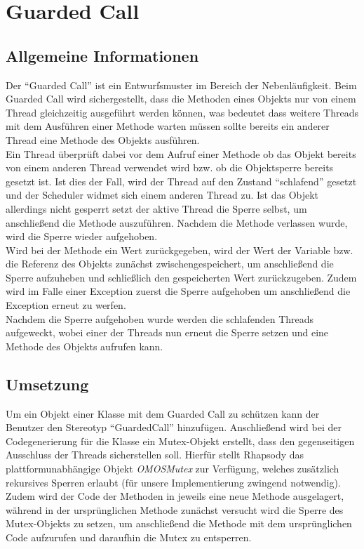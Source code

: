 \chapter{Guarded Call}

\section{Allgemeine Informationen}
Der \enquote{Guarded Call} ist ein Entwurfsmuster im Bereich der Nebenläufigkeit. Beim Guarded Call wird sichergestellt, dass die Methoden eines Objekts nur von einem Thread gleichzeitig ausgeführt werden können, was bedeutet dass weitere Threads mit dem Ausführen einer Methode warten müssen sollte bereits ein anderer Thread eine Methode des Objekts ausführen. \cite[S. 190]{douglass2010design}
\\
Ein Thread überprüft dabei vor dem Aufruf einer Methode ob das Objekt bereits von einem anderen Thread verwendet wird bzw. ob die Objektsperre bereits gesetzt ist. Ist dies der Fall, wird der Thread auf den Zustand \enquote{schlafend} gesetzt und der Scheduler widmet sich einem anderen Thread zu. Ist das Objekt allerdings nicht gesperrt setzt der aktive Thread die Sperre selbst, um anschließend die Methode auszuführen. Nachdem die Methode verlassen wurde, wird die Sperre wieder aufgehoben.
\\
Wird bei der Methode ein Wert zurückgegeben, wird der Wert der Variable bzw. die Referenz des Objekts zunächst zwischengespeichert, um anschließend die Sperre aufzuheben und schließlich den gespeicherten Wert zurückzugeben. Zudem wird im Falle einer Exception zuerst die Sperre aufgehoben um anschließend die Exception erneut zu werfen.
\\
Nachdem die Sperre aufgehoben wurde werden die schlafenden Threads aufgeweckt, wobei einer der Threads nun erneut die Sperre setzen und eine Methode des Objekts aufrufen kann.

\section{Umsetzung}
Um ein Objekt einer Klasse mit dem Guarded Call zu schützen kann der Benutzer den Stereotyp \enquote{GuardedCall} hinzufügen. Anschließend wird bei der Codegenerierung für die Klasse ein Mutex-Objekt erstellt, dass den gegenseitigen Ausschluss der Threads sicherstellen soll. Hierfür stellt Rhapsody das plattformunabhängige Objekt \textit{OMOSMutex} zur Verfügung, welches zusätzlich rekursives Sperren erlaubt (für unsere Implementierung zwingend notwendig).
\\
Zudem wird der Code der Methoden in jeweils eine neue Methode ausgelagert, während in der ursprünglichen Methode zunächst versucht wird die Sperre des Mutex-Objekts zu setzen, um anschließend die Methode mit dem ursprünglichen Code aufzurufen und daraufhin die Mutex zu entsperren.


